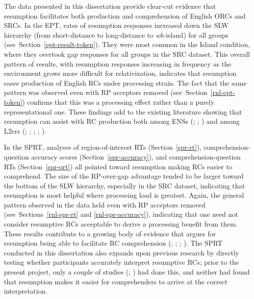 The data presented in this dissertation provide clear-cut evidence that resumption facilitates both production and comprehension of English ORCs and SRCs. In the EPT, rates of resumption responses increased down the SLW hierarchy (from short-distance to long-distance to \textit{wh}-island) for all groups (see~Section~\ref{ept-result-token}). They were most common in the Island condition, where they overtook gap responses for all groups in the SRC dataset. This overall pattern of results, with resumption responses increasing in frequency as the environment grows more difficult for relativization, indicates that resumption eases production of English RCs under processing strain. The fact that the same pattern was observed even with RP acceptors\footnotemark{} removed (see~Section~\ref{rnl-ept-token}) confirms that this was a processing effect rather than a purely representational one. These findings add to the existing literature showing that resumption can assist with RC production both among ENSs (\cite{ferreira.swets2005}; \cite{morgan.wagers2018}; \cite{zukowski.larsen2004}) and among L2ers (\cite{algady2013}; \cite{hyltenstam1984,hyltenstam1990}; \cite{kim2013}; \cite{maghrabi1997}; \cite{pavesi1986}).


In the SPRT, analyses of region-of-interest RTs (Section~\ref{spr-rt}), comprehension-question accuracy scores (Section~\ref{spr-accuracy}), and comprehension-question RTs (Section~\ref{spr-qrt}) all pointed toward resumption making RCs easier to comprehend. The size of the RP-over-gap advantage tended to be larger toward the bottom of the SLW hierarchy, especially in the SRC dataset, indicating that resumption is most helpful where processing load is greatest. Again, the general pattern observed in the data held even with RP acceptors removed (see~Sections~\ref{rnl-spr-rt} and \ref{rnl-spr-accuracy}), indicating that one need not consider resumptive RCs acceptable to derive a processing benefit from them. These results contribute to a growing body of evidence that argues for resumption being able to facilitate RC comprehension (\cite{beltrama.xiang2016}; \cite{hammerly2022}; \cite{hofmeister.norcliffe2013}; \cite{zenker.schwartz2021a}). The SPRT conducted in this dissertation also expands upon previous research by directly testing whether participants accurately interpret resumptive RCs; prior to the present project, only a couple of studies (\cite{hammerly2022}; \cite{morgan.etal2020}) had done this, and neither had found that resumption makes it easier for comprehenders to arrive at the correct interpretation.

